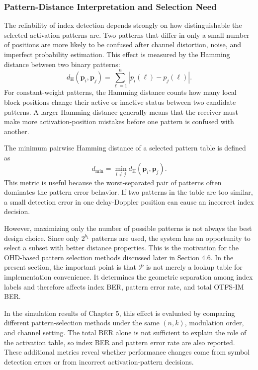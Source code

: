 \subsubsection{Pattern-Distance Interpretation and Selection Need}

The reliability of index detection depends strongly on how distinguishable the selected activation patterns are. Two patterns that differ in only a small number of positions are more likely to be confused after channel distortion, noise, and imperfect probability estimation. This effect is measured by the Hamming distance between two binary patterns:
\begin{equation}
    d_{\mathrm{H}}(\mathbf{p}_i,\mathbf{p}_j)
    =
    \sum_{\ell=1}^{n}
    \left|
    p_i(\ell) - p_j(\ell)
    \right| .
    \label{eq:pattern_hamming_distance}
\end{equation}
For constant-weight patterns, the Hamming distance counts how many local block positions change their active or inactive status between two candidate patterns. A larger Hamming distance generally means that the receiver must make more activation-position mistakes before one pattern is confused with another.

The minimum pairwise Hamming distance of a selected pattern table is defined as
\begin{equation}
    d_{\min}
    =
    \min_{i \ne j}
    d_{\mathrm{H}}(\mathbf{p}_i,\mathbf{p}_j).
    \label{eq:pattern_min_distance}
\end{equation}
This metric is useful because the worst-separated pair of patterns often dominates the pattern error behavior. If two patterns in the table are too similar, a small detection error in one delay-Doppler position can cause an incorrect index decision.

However, maximizing only the number of possible patterns is not always the best design choice. Since only \(2^{b_1}\) patterns are used, the system has an opportunity to select a subset with better distance properties. This is the motivation for the OHD-based pattern selection methods discussed later in Section 4.6. In the present section, the important point is that \(\mathcal{P}\) is not merely a lookup table for implementation convenience. It determines the geometric separation among index labels and therefore affects index BER, pattern error rate, and total OTFS-IM BER.

In the simulation results of Chapter 5, this effect is evaluated by comparing different pattern-selection methods under the same \((n,k)\), modulation order, and channel setting. The total BER alone is not sufficient to explain the role of the activation table, so index BER and pattern error rate are also reported. These additional metrics reveal whether performance changes come from symbol detection errors or from incorrect activation-pattern decisions.
